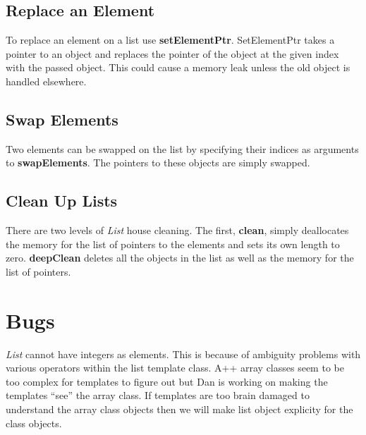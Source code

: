 \subsection{Replace an Element}
To replace an element on a list use {\bf setElementPtr}.  SetElementPtr takes a pointer to an object
and replaces the pointer of the object at the given index with the passed object.  This could cause
a memory leak unless the old object is handled elsewhere.

\subsection{Swap Elements}
Two elements can be swapped on the list by specifying their indices as arguments to {\bf swapElements}.  The pointers to these objects are simply swapped.

\subsection{Clean Up Lists}
There are two levels of {\em List} house cleaning.  The first, {\bf clean}, simply deallocates the memory for the list of pointers to the elements and sets its own length to zero.  {\bf deepClean} deletes all the objects in the list as well as the memory for the list of pointers.

\section{Bugs}
{\em List} cannot have integers as elements.  This is because of ambiguity problems with various operators within the list template class.  A++ array classes seem to be too complex for templates to figure out but Dan is working on making the templates ``see'' the array class.  If templates are too brain damaged to
understand the array class objects then we will make list object explicity for
the class objects.















